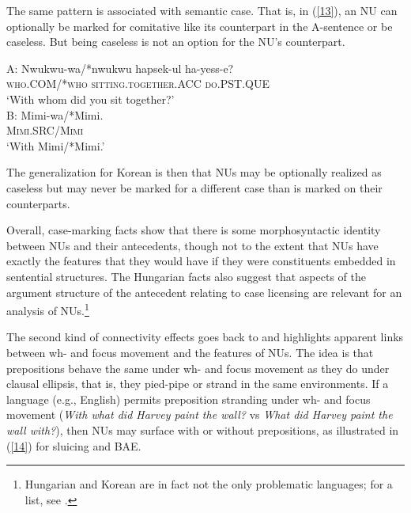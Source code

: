 \documentclass[output=paper
                ,modfonts
                ,nonflat
	        ,collection
	        ,collectionchapter
	        ,collectiontoclongg
 	        ,biblatex
                ,babelshorthands
                ,newtxmath
                ,draftmode
                ,colorlinks, citecolor=brown
]{./langsci/langscibook}
\begin{document}
{The same pattern is associated with semantic case. That is, in (\ref{13}), an NU can optionally be marked for comitative like its counterpart in the A-sentence or be caseless. But being caseless is not an option for the NU's counterpart.

\ea
A: \gll Nwukwu-wa/*nwukwu  hapsek-ul ha-yess-e?\\
\textsc{who.COM/*who}  \textsc{sitting.together.ACC} \textsc{do.PST.QUE}\\
\glt  `With whom did you sit together?'\\

B: \gll Mimi-wa/*Mimi.\\
\textsc{Mimi.SRC/Mimi}\\
\glt `With Mimi/*Mimi.' \label{13}\z

The generalization for Korean is then that NUs may be optionally realized as caseless but may never be marked for a different case than is marked on their counterparts.

Overall, case-marking facts show that there is some morphosyntactic identity between NUs and their antecedents, though not to the extent that NUs have exactly the features that they would have if they were constituents embedded in sentential structures. The Hungarian facts also suggest that aspects of the argument structure of the antecedent relating to case licensing are relevant for an analysis of NUs.\footnote{Hungarian and Korean are in fact not the only problematic languages; for a list, see \citet{Vicente2015}.}

The second kind of connectivity effects goes back to \citet{Merchant2001, Merchant2004} and highlights apparent links between wh- and focus movement and the features of NUs. The idea is that prepositions behave the same under wh- and focus movement as they do under clausal ellipsis, that is, they pied-pipe or strand in the same environments. If a language (e.g., English) permits preposition stranding under wh- and focus movement ({\it With what did Harvey paint the wall?} vs {\it What did Harvey paint the wall with?}), then NUs may surface with or without prepositions, as illustrated in (\ref{14}) for sluicing and BAE.

}
\end{document}
